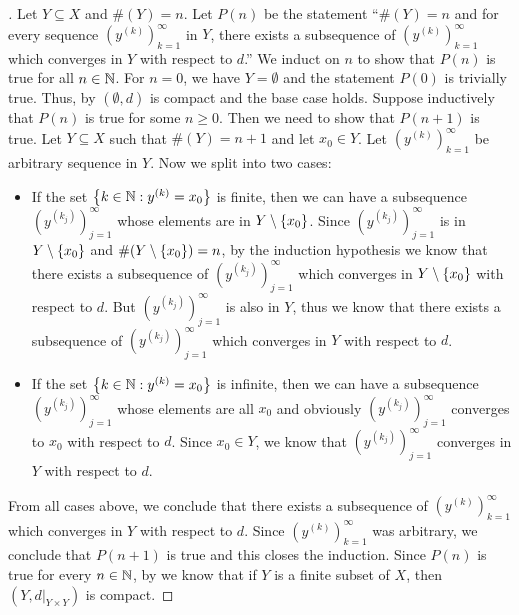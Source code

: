 \begin{proof}[]
  Let \(Y \subseteq X\) and \(\#(Y) = n\).
  Let \(P(n)\) be the statement ``\(\#(Y) = n\) and for every sequence \((y^{(k)})_{k = 1}^\infty\) in \(Y\), there exists a subsequence of \((y^{(k)})_{k = 1}^\infty\) which converges in \(Y\) with respect to \(d\).''
  We induct on \(n\) to show that \(P(n)\) is true for all \(n \in \mathbb{N}\).
  For \(n = 0\), we have \(Y = \emptyset\) and the statement \(P(0)\) is trivially true.
  Thus, by  \((\emptyset, d)\) is compact and the base case holds.
  Suppose inductively that \(P(n)\) is true for some \(n \geq 0\).
  Then we need to show that \(P(n + 1)\) is true.
  Let \(Y \subseteq X\) such that \(\#(Y) = n + 1\) and let \(x_0 \in Y\).
  Let \((y^{(k)})_{k = 1}^\infty\) be arbitrary sequence in \(Y\).
  Now we split into two cases:
  \begin{itemize}
    \item If the set \(\left\lbrace k \in \mathbb{N} : y^{(k)} = x_0\right\rbrace\) is finite, then we can have a subsequence \((y^{(k_j)})_{j = 1}^\infty\) whose elements are in \(Y \setminus \left\lbrace x_0\right\rbrace\).
          Since \((y^{(k_j)})_{j = 1}^\infty\) is in \(Y \setminus \left\lbrace x_0\right\rbrace\) and \(\#(Y \setminus \left\lbrace x_0\right\rbrace) = n\), by the induction hypothesis we know that there exists a subsequence of \((y^{(k_j)})_{j = 1}^\infty\) which converges in \(Y \setminus \left\lbrace x_0\right\rbrace\) with respect to \(d\).
          But \((y^{(k_j)})_{j = 1}^\infty\) is also in \(Y\), thus we know that there exists a subsequence of \((y^{(k_j)})_{j = 1}^\infty\) which converges in \(Y\) with respect to \(d\).
    \item If the set \(\left\lbrace k \in \mathbb{N} : y^{(k)} = x_0\right\rbrace\) is infinite, then we can have a subsequence \((y^{(k_j)})_{j = 1}^\infty\) whose elements are all \(x_0\) and obviously \((y^{(k_j)})_{j = 1}^\infty\) converges to \(x_0\) with respect to \(d\).
          Since \(x_0 \in Y\), we know that \((y^{(k_j)})_{j = 1}^\infty\) converges in \(Y\) with respect to \(d\).
  \end{itemize}
  From all cases above, we conclude that there exists a subsequence of \((y^{(k)})_{k = 1}^\infty\) which converges in \(Y\) with respect to \(d\).
  Since \((y^{(k)})_{k = 1}^\infty\) was arbitrary, we conclude that \(P(n + 1)\) is true and this closes the induction.
  Since \(P(n)\) is true for every \(n \in \mathbb{N}\), by  we know that if \(Y\) is a finite subset of \(X\), then \((Y, d|_{Y \times Y})\) is compact.
\end{proof}

